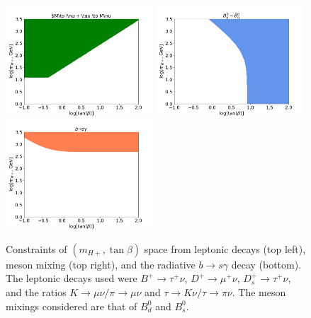 \documentclass[a4paper,12pt]{article}
\begin{document}
\begin{figure}[ht]
    \vspace{-12pt}
    \centering
    \includegraphics[width=0.49\textwidth]{indy/leps.png}
    \includegraphics[width=0.49\textwidth]{indy/bmix.png}
    \includegraphics[width=0.49\textwidth]{indy/bsgamma.png}
    \caption{\label{fig:indies}Constraints of $(m_{H+},\tan\beta)$ space from leptonic decays (top left), meson mixing (top right), and the radiative $b\to s\gamma$ decay (bottom). The leptonic decays used were $B^+\to\tau^+\nu$, $D^+\to\mu^+\nu$, $D_s^+\to\tau^+\nu$, and the ratios $K\to\mu\nu/\pi\to\mu\nu$ and $\tau\to K\nu/\tau\to\pi\nu$. The meson mixings considered are that of $B^0_d$ and $B_s^0$.}
\end{figure}
\end{document}

